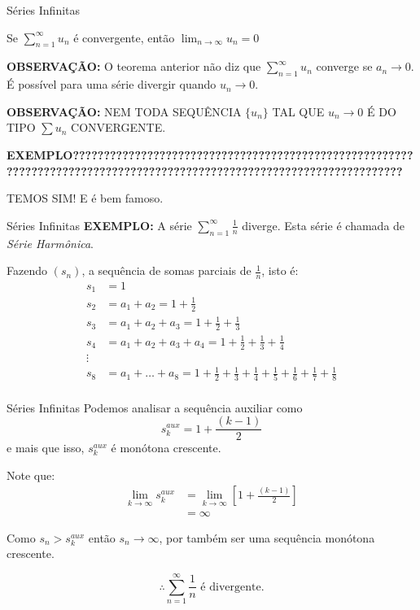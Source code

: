 \documentclass[hyperref={pdfpagelabels=false}]{beamer}
\begin{document}
\begin{frame}{Séries Infinitas}
    \begin{theorem}
        Se $\displaystyle \sum_{n=1}^{\infty}u_n$ é convergente, então $\displaystyle \lim_{n\to \infty}u_n = 0$
    \end{theorem} \pause
    
{\bf OBSERVAÇÃO:} O teorema anterior não diz que $\displaystyle \sum_{n=1}^{\infty}u_n$ converge se $a_n \to 0$. É possível para uma série divergir quando $u_n \to 0$. \pause

{\bf OBSERVAÇÃO:} NEM TODA SEQUÊNCIA $\{u_n\}$ TAL QUE $u_n \to 0$ É DO TIPO $\displaystyle \sum u_n$ CONVERGENTE. \pause

{\bf EXEMPLO???????????????????????????????????????????????????????????????????????????????????????????????????????????????????????} \pause

TEMOS SIM! E é bem famoso.

\end{frame}

\begin{frame}{Séries Infinitas}
    {\bf EXEMPLO:} A série $\displaystyle \sum_{n=1}^{\infty} \frac{1}{n}$ diverge. Esta série é chamada de \emph{Série Harmônica}. \pause
    
    Fazendo $(s_n)$, a sequência de somas parciais de $\displaystyle \frac{1}{n}$, isto é:
    \begin{align*}
        s_1 &= 1 \\
        s_2 &= a_1 + a_2 = 1 + \frac{1}{2} \\
        s_3 &= a_1 + a_2 + a_3 = 1 + \frac{1}{2} + \frac{1}{3} \\
        s_4 &= a_1 + a_2 + a_3 + a_4 = 1 + \frac{1}{2} + \frac{1}{3} + \frac{1}{4} \\
        \vdots \\
        s_8 &= a_1 + \dots + a_8 = 1 + \frac{1}{2} + \frac{1}{3} + \frac{1}{4} + \frac{1}{5} + \frac{1}{6} + \frac{1}{7} + \frac{1}{8} \\
    \end{align*}

\end{frame}


\begin{frame}{Séries Infinitas}
    Podemos analisar a sequência auxiliar como $$s_k^{aux} = 1 + \frac{(k-1)}{2}$$ e mais que isso, $s_k^{aux}$ é monótona crescente. \pause
    
    Note que:
    \begin{align*}
        \lim_{k\to \infty}s_k^{aux} &= \lim_{k\to \infty}\left[1 + \frac{(k-1)}{2}\right] \\ &= \infty
    \end{align*}

    Como $s_n > s_k^{aux}$ então $s_n \to \infty$, por também ser uma sequência monótona crescente. \pause
    
    $$\therefore \displaystyle \sum_{n=1}^{\infty} \frac{1}{n} \text{ é divergente}.$$
    
\end{frame}
\end{document}
